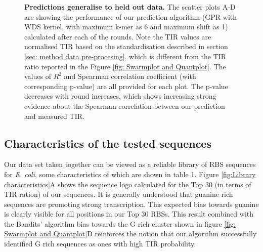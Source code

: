 \documentclass{article}
\begin{document}
\begin{figure}[!ht]
\begin{subfigure}[b]{0.49\textwidth}
    \end{subfigure}
    \caption{\textbf{Predictions generalise to held out data.} The scatter plots A-D are showing the performance of our prediction algorithm (GPR with WDS kernel, with maximum k-mer as 6 and maximum shift as 1) calculated after each of the rounds.
    Note the TIR values are normalised TIR based on the standardisation described in section \ref{sec: method data pre-procesing}, which is different from the TIR ratio reported in the Figure \ref{fig: Swarmplot and Quantplot}.
    The values of 
    $R^2$ and Spearman correlation coefficient (with corresponding p-value) are all provided for each plot.
    The p-value decreases with round increases, which shows increasing strong evidence about the Spearman correlation between our prediction and measured TIR. 
    }
    \label{fig: Scatterplot}
\end{figure}

\subsection{Characteristics of the tested sequences}

Our data set taken together can be viewed as a reliable library of RBS sequences for \emph{E. coli}, some characteristics of which are shown in table 1.
Figure \ref{fig:Library characteristics}A shows the sequence logo calculated for the Top 30 (in terms of TIR ration) of our sequences.
It is generally understood that guanine rich sequences are promoting strong transcription.
This expected bias towards guanine is clearly visible for all positions in our Top 30 RBSs.
This result combined with the Bandits' algorithm bias towards the G rich cluster shown in figure \ref{fig: Swarmplot and Quantplot}D reinforces the notion that our algorithm successfully identified G rich sequences as ones with high TIR probability.
\end{document}
